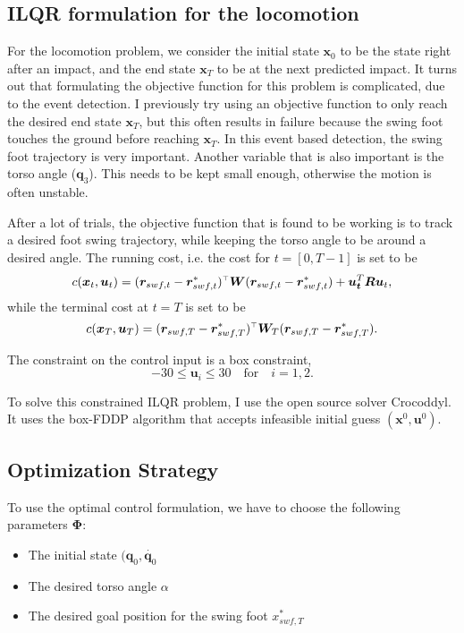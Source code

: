 \subsection{ILQR formulation for the locomotion}
For the locomotion problem, we consider the initial state $\bm{x}_0$ to be the state right after an impact, and the end state $\bm{x}_T$ to be at the next predicted impact. It turns out that formulating the objective function for this problem is complicated, due to the event detection. I previously try using an objective function to only reach the desired end state $\bm{x}_T$, but this often results in failure because the swing foot touches the ground before reaching $\bm{x}_T$. In this event based detection, the swing foot trajectory is very important. Another variable that is also important is the torso angle ($\bm{q}_3$). This needs to be kept small enough, otherwise the motion is often unstable. 

After a lot of trials, the objective function that is found to be working is to track a desired foot swing trajectory, while keeping the torso angle to be around a desired angle. The running cost, i.e. the cost for $t = [0, T-1] $ is set to be
\begin{equation}
c(\bm{x}_t, \bm{u}_t) = (\bm{r}_{swf, t} - \bm{r}_{swf, t}^*)^{\scriptscriptstyle\top} \bm{W} (\bm{r}_{swf,t} - \bm{r}_{swf, t}^*) + \bm{u_t}^T \bm{R} \bm{u}_t,
\end{equation}
while the terminal cost at $t = T$ is set to be 
\begin{equation}
c(\bm{x}_T, \bm{u}_T) = (\bm{r}_{swf, T} - \bm{r}_{swf, T}^*)^{\scriptscriptstyle\top} \bm{W}_T (\bm{r}_{swf, T} - \bm{r}_{swf, T}^*).
\end{equation}

The constraint on the control input is a box constraint, 
\begin{equation}
-30 \leq \bm{u}_i \leq 30 \quad \text{for} \quad  i = 1, 2 . 
\end{equation}

To solve this constrained ILQR problem, I use the open source solver Crocoddyl. It uses the box-FDDP algorithm that accepts infeasible initial guess $(\bm{x}^0, \bm{u}^0)$. 

\subsection{Optimization Strategy}
\label{sec:opt_strat}

To use the optimal control formulation, we have to choose the following parameters $\bm{\Phi}$:
\begin{itemize}
\item The initial state $(\bm{q}_0, \dot{\bm{q}_0}$
\item The desired torso angle $\alpha$
\item The desired goal position for the swing foot $x_{swf,T}^*$
\end{itemize}

